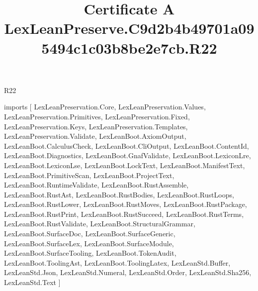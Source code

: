 \begin{lexlean}{R22}
\title{Certificate A LexLeanPreserve.C9d2b4b49701a095494c1c03b8be2e7cb.R22}
\begin{coremodule}
imports [
  LexLeanPreservation.Core,
  LexLeanPreservation.Values,
  LexLeanPreservation.Primitives,
  LexLeanPreservation.Fixed,
  LexLeanPreservation.Keys,
  LexLeanPreservation.Templates,
  LexLeanPreservation.Validate,
  LexLeanBoot.AxiomOutput,
  LexLeanBoot.CalculusCheck,
  LexLeanBoot.CliOutput,
  LexLeanBoot.ContentId,
  LexLeanBoot.Diagnostics,
  LexLeanBoot.GnafValidate,
  LexLeanBoot.LexiconLre,
  LexLeanBoot.LexiconLse,
  LexLeanBoot.LockText,
  LexLeanBoot.ManifestText,
  LexLeanBoot.PrimitiveScan,
  LexLeanBoot.ProjectText,
  LexLeanBoot.RuntimeValidate,
  LexLeanBoot.RustAssemble,
  LexLeanBoot.RustAst,
  LexLeanBoot.RustBodies,
  LexLeanBoot.RustLoops,
  LexLeanBoot.RustLower,
  LexLeanBoot.RustMoves,
  LexLeanBoot.RustPackage,
  LexLeanBoot.RustPrint,
  LexLeanBoot.RustSucceed,
  LexLeanBoot.RustTerms,
  LexLeanBoot.RustValidate,
  LexLeanBoot.StructuralGrammar,
  LexLeanBoot.SurfaceDoc,
  LexLeanBoot.SurfaceGeneric,
  LexLeanBoot.SurfaceLex,
  LexLeanBoot.SurfaceModule,
  LexLeanBoot.SurfaceTooling,
  LexLeanBoot.TokenAudit,
  LexLeanBoot.ToolingAst,
  LexLeanBoot.ToolingLatex,
  LexLeanStd.Buffer,
  LexLeanStd.Json,
  LexLeanStd.Numeral,
  LexLeanStd.Order,
  LexLeanStd.Sha256,
  LexLeanStd.Text
]


\end{coremodule}
\end{lexlean}
